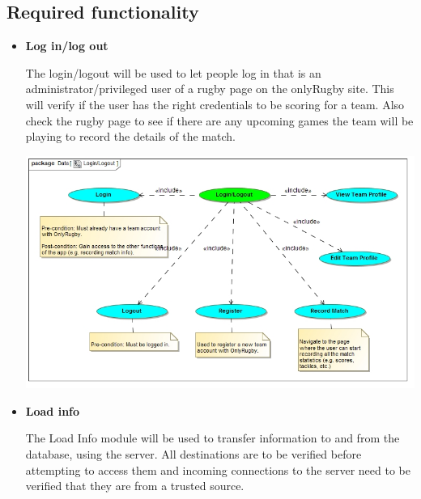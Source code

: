 \documentclass[a4paper,12pt]{report}
\begin{document}
\subsection{Required functionality}
\begin{itemize}
	\item \textbf{Log in/log out}
		\begin{flushleft}
		 The login/logout will be used to let people log in that is an administrator/privileged  user of a rugby page on the onlyRugby site. This will verify if the user has the right credentials to be scoring for a team. Also check the rugby page to see if there are any upcoming games the team will be playing to record the details of the match. 	
		\end{flushleft}
		\begin{center}
  	 	\includegraphics[width=1\textwidth] {./Diagrams/Login_Logout.jpg}\\[0.4cm]    
		\end{center}
\newpage
\item \textbf{Load info}
		\begin{flushleft}
			The Load Info module will be used to transfer information to and from the database, using the server. All destinations are to be verified before attempting to access them and incoming connections to the server need to be verified that they are from a trusted source.
		\end{flushleft}
		\begin{center}

\end{center}
\end{itemize}
\end{document}
